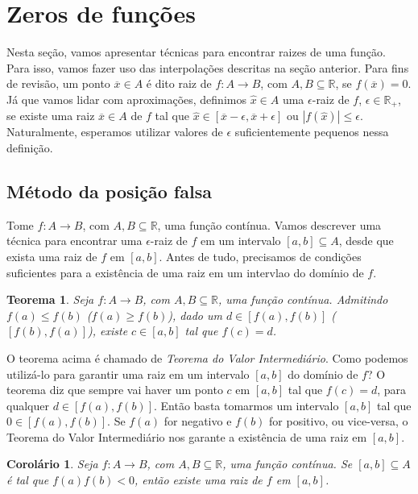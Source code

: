 \documentclass[]{article}
\newtheorem{teorema}{Teorema}
\newtheorem{corolario}{Corolário}
\numberwithin{equation}{section}
\begin{document}
\section{Zeros de funções}

Nesta seção, vamos apresentar técnicas para encontrar raizes de uma função. Para isso, vamos fazer uso das interpolações descritas na seção anterior. Para fins de revisão, um ponto $\overline{x} \in A$ é dito raiz de $f : A \to B$, com $A, B \subseteq \mathbb{R}$, se $f(\overline{x}) = 0$. Já que vamos lidar com aproximações, definimos $\hat{x} \in A$ uma $\epsilon$-raiz de $f$, $\epsilon \in \mathbb{R}_+$, se existe uma raiz $\overline{x} \in A$ de $f$ tal que $\hat{x} \in [\overline{x} - \epsilon, \overline{x} + \epsilon]$ ou $|f(\hat{x})| \leq \epsilon$. Naturalmente, esperamos utilizar valores de $\epsilon$ suficientemente pequenos nessa definição.

\subsection{Método da posição falsa}

Tome $f : A \to B$, com $A, B \subseteq \mathbb{R}$, uma função contínua. Vamos descrever uma técnica para encontrar uma $\epsilon$-raiz de $f$ em um intervalo $[a, b] \subseteq A$, desde que exista uma raiz de $f$ em $[a, b]$. Antes de tudo, precisamos de condições suficientes para a existência de uma raiz em um intervlao do domínio de $f$.

\begin{teorema}
	Seja $f : A \to B$, com $A, B \subseteq \mathbb{R}$, uma função contínua. Admitindo $f(a) \leq f(b)$ ($f(a) \geq f(b)$), dado um $d \in [f(a), f(b)]$ ($[f(b), f(a)]$), existe $c \in [a, b]$ tal que $f(c) = d$.
\end{teorema}

O teorema acima é chamado de \emph{Teorema do Valor Intermediário}. Como podemos utilizá-lo para garantir uma raiz em um intervalo $[a, b]$ do domínio de $f$? O teorema diz que sempre vai haver um ponto $c$ em $[a, b]$ tal que $f(c) = d$, para qualquer $d \in [f(a), f(b)]$. Então basta tomarmos um intervalo $[a, b]$ tal que $0 \in [f(a), f(b)]$. Se $f(a)$ for negativo e $f(b)$ for positivo, ou vice-versa, o Teorema do Valor Intermediário nos garante a existência de uma raiz em $[a, b]$.

\begin{corolario}
	Seja $f : A \to B$, com $A, B \subseteq \mathbb{R}$, uma função contínua. Se $[a, b] \subseteq A$ é tal que $f(a)f(b) < 0$, então existe uma raiz de $f$ em $[a, b]$.
\end{corolario}
\end{document}
